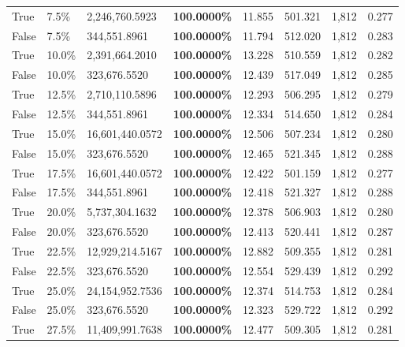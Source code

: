 \begin{table}[H]
\begin{tabular}{lllrllll}
\cline{1-8}
True & 7.5\% & 2,246,760.5923 & \bfseries \color{red} 100.0000\% & 11.855 & 501.321 & 1,812 & 0.277 \\
\cline{1-8}
False & 7.5\% & 344,551.8961 & \bfseries \color{red} 100.0000\% & 11.794 & 512.020 & 1,812 & 0.283 \\
\cline{1-8}
True & 10.0\% & 2,391,664.2010 & \bfseries \color{red} 100.0000\% & 13.228 & 510.559 & 1,812 & 0.282 \\
\cline{1-8}
False & 10.0\% & 323,676.5520 & \bfseries \color{red} 100.0000\% & 12.439 & 517.049 & 1,812 & 0.285 \\
\cline{1-8}
True & 12.5\% & 2,710,110.5896 & \bfseries \color{red} 100.0000\% & 12.293 & 506.295 & 1,812 & 0.279 \\
\cline{1-8}
False & 12.5\% & 344,551.8961 & \bfseries \color{red} 100.0000\% & 12.334 & 514.650 & 1,812 & 0.284 \\
\cline{1-8}
True & 15.0\% & 16,601,440.0572 & \bfseries \color{red} 100.0000\% & 12.506 & 507.234 & 1,812 & 0.280 \\
\cline{1-8}
False & 15.0\% & 323,676.5520 & \bfseries \color{red} 100.0000\% & 12.465 & 521.345 & 1,812 & 0.288 \\
\cline{1-8}
True & 17.5\% & 16,601,440.0572 & \bfseries \color{red} 100.0000\% & 12.422 & 501.159 & 1,812 & 0.277 \\
\cline{1-8}
False & 17.5\% & 344,551.8961 & \bfseries \color{red} 100.0000\% & 12.418 & 521.327 & 1,812 & 0.288 \\
\cline{1-8}
True & 20.0\% & 5,737,304.1632 & \bfseries \color{red} 100.0000\% & 12.378 & 506.903 & 1,812 & 0.280 \\
\cline{1-8}
False & 20.0\% & 323,676.5520 & \bfseries \color{red} 100.0000\% & 12.413 & 520.441 & 1,812 & 0.287 \\
\cline{1-8}
True & 22.5\% & 12,929,214.5167 & \bfseries \color{red} 100.0000\% & 12.882 & 509.355 & 1,812 & 0.281 \\
\cline{1-8}
False & 22.5\% & 323,676.5520 & \bfseries \color{red} 100.0000\% & 12.554 & 529.439 & 1,812 & 0.292 \\
\cline{1-8}
True & 25.0\% & 24,154,952.7536 & \bfseries \color{red} 100.0000\% & 12.374 & 514.753 & 1,812 & 0.284 \\
\cline{1-8}
False & 25.0\% & 323,676.5520 & \bfseries \color{red} 100.0000\% & 12.323 & 529.722 & 1,812 & 0.292 \\
\cline{1-8}
True & 27.5\% & 11,409,991.7638 & \bfseries \color{red} 100.0000\% & 12.477 & 509.305 & 1,812 & 0.281 \\

\end{tabular}
\end{table}
